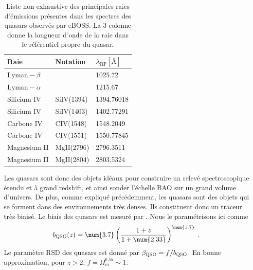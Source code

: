 \begin{table}[]
  \centering
  \caption{Liste non exhaustive des principales raies d'émissions présentes dans les spectres des quasars observés par eBOSS. La 3 colonne donne la longueur d'onde de la raie dans le référentiel propre du quasar.}
  \label{tab:raies}
  \begin{tabular}{lll}
    \toprule
    Raie & Notation & $\lambda_{\mathrm{\mathrm{RF}}} [\si{\angstrom}]$ \\
    \midrule
    $\mathrm{Lyman-}\beta$ & \lyb{}  & \num{1025.72} \\
    $\mathrm{Lyman-}\alpha$ & \lya{} & \num{1215.67} \\
    Silicium IV & SiIV(1394) & \num{1394.76018} \\
    Silicium IV & SiIV(1403) & \num{1402.77291} \\
    Carbone IV & CIV(1548) & \num{1548.2049} \\
    Carbone IV & CIV(1551) & \num{1550.77845} \\
    Magnesium II & MgII(2796) & \num{2796.3511} \\
    Magnesium II & MgII(2804) & \num{2803.5324}\\
    \bottomrule
  \end{tabular}
\end{table}

Les quasars sont donc des objets idéaux pour construire un relevé spectroscopique étendu et à grand redshift, et ainsi sonder l'échelle BAO sur un grand volume d'univers. De plus, comme expliqué précédemment, les quasars sont des objets qui se forment dans des environnements très denses. Ils constituent donc un traceur très biaisé. Le biais des quasars est mesuré par \textcite{Laurent2017}. Nous le paramétrisons ici comme
\begin{equation}
  \label{eq:b_qso}
b_{\textsc{QSO}}(z) = \num{3.7} \left(\frac{1+z}{1+\num{2.33}}\right)^{\num{1.7}}  \; .
\end{equation} 
Le paramètre RSD des quasars est donné par $\beta_{\textsc{QSO}} = f / b_{\textsc{QSO}}$. En bonne approximation, pour $z > 2$, $f = \Omega_m^{\num{0.55}} \sim 1$. 


